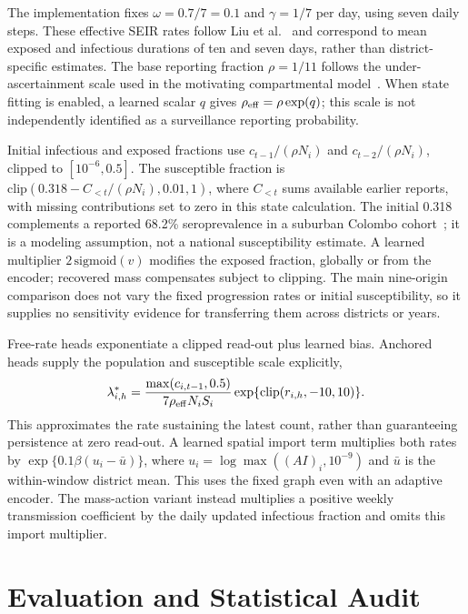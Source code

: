 \documentclass[conference]{IEEEtran}
\begin{document}
The implementation fixes $\omega=0.7/7=0.1$ and $\gamma=1/7$ per day, using seven daily steps. %
These effective SEIR rates follow Liu et al.~\cite{liu2025seirlstm} and correspond to mean exposed and infectious durations of ten and seven days, rather than district-specific estimates. %
The base reporting fraction $\rho=1/11$ follows the under-ascertainment scale used in the motivating compartmental model~\cite{liu2025seirlstm}. %
When state fitting is enabled, a learned scalar $q$ gives $\rho_{\rm eff}=\rho\exp(q)$; this scale is not independently identified as a surveillance reporting probability. %

Initial infectious and exposed fractions use $c_{t-1}/(\rho N_i)$ and $c_{t-2}/(\rho N_i)$, clipped to $[10^{-6},0.5]$. %
The susceptible fraction is $\mathrm{clip}(0.318-C_{<t}/(\rho N_i),0.01,1)$, where $C_{<t}$ sums available earlier reports, with missing contributions set to zero in this state calculation. %
The initial 0.318 complements a reported 68.2\% seroprevalence in a suburban Colombo cohort~\cite{jeewandara2015sero}; it is a modeling assumption, not a national susceptibility estimate. %
A learned multiplier $2\,\mathrm{sigmoid}(v)$ modifies the exposed fraction, globally or from the encoder; recovered mass compensates subject to clipping. %
The main nine-origin comparison does not vary the fixed progression rates or initial susceptibility, so it supplies no sensitivity evidence for transferring them across districts or years.

Free-rate heads exponentiate a clipped read-out plus learned bias.
Anchored heads supply the population and susceptible scale explicitly,
\begin{equation}
\lambda^*_{i,h}=\frac{\max(c_{i,t-1},0.5)}{7\rho_{\rm eff}N_iS_i}
\exp\{\mathrm{clip}(r_{i,h},-10,10)\}.
\end{equation}
This approximates the rate sustaining the latest count, rather than guaranteeing persistence at zero read-out.
A learned spatial import term multiplies both rates by $\exp\{0.1\beta(u_i-\bar u)\}$, where $u_i=\log\max((AI)_i,10^{-9})$ and $\bar u$ is the within-window district mean. %
This uses the fixed graph even with an adaptive encoder.
The mass-action variant instead multiplies a positive weekly transmission coefficient by the daily updated infectious fraction and omits this import multiplier.

\section{Evaluation and Statistical Audit}\label{sec:setup}
\end{document}

